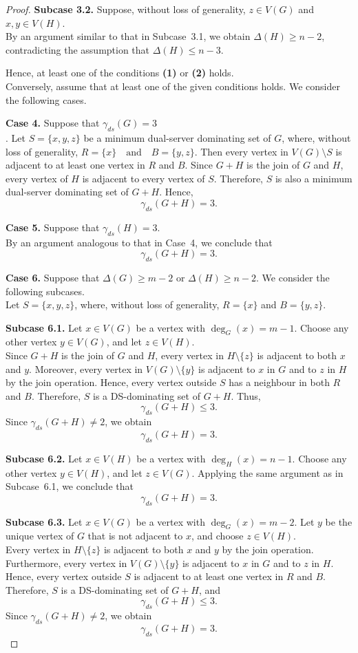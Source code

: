 \documentclass{article}
\begin{document}
\begin{proof}
\textbf{Subcase 3.2.} Suppose, without loss of generality, $z\in V(G)$ and $x,y\in V(H).$\\  By an argument similar to that in Subcase~3.1, we obtain $
\Delta(H)\ge n-2$,
contradicting the assumption that $
\Delta(H)\le n-3$.

Hence, at least one of the conditions \textbf{(1)} or \textbf{(2)} holds. \\
Conversely, assume that at least one of the given conditions holds. We consider the following cases.

\textbf{Case 4.} Suppose that $\gamma_{ds}(G)=3$\\. Let $S=\{x,y,z\}$
be a minimum dual-server dominating set of $G$, where, without loss of generality, $R=\{x\} \quad \text{and} \quad B=\{y,z\}$. Then every vertex in $V(G)\setminus S$ is adjacent to at least one vertex in $R$ and $B$. Since $G+H$ is the join of $G$ and $H$, every vertex of $H$ is adjacent to every vertex of $S$. Therefore, $S$ is also a minimum dual-server dominating set of $G+H$. Hence,
\[
\gamma_{ds}(G+H)= 3.
\]

\textbf{Case 5.} Suppose that $\gamma_{ds}(H)=3$.\\ By an argument analogous to that in Case~4, we conclude that
\[
\gamma_{ds}(G+H)=3.
\]

\textbf{Case 6.} Suppose that $\Delta(G)\ge m-2$  or  $\Delta(H)\ge n-2$.
We consider the following subcases.\\
Let $S=\{x,y,z\}$,
where, without loss of generality, $R=\{x\}$ and  $B=\{y,z\}$.

\textbf{Subcase 6.1.} Let $x\in V(G)$ be a vertex with $\deg_G(x)=m-1$.
Choose any other vertex $y\in V(G)$, and let $z\in V(H)$.\\
Since $G+H$ is the join of $G$ and $H$, every vertex in $H\setminus\{z\}$ is adjacent to both $x$ and $y$. Moreover, every vertex in $V(G)\setminus\{y\}$ is adjacent to $x$ in $G$ and to $z$ in $H$ by the join operation. Hence, every vertex outside $S$ has a neighbour in both $R$ and $B$. Therefore, $S$ is a DS-dominating set of $G+H$. Thus,
\[
\gamma_{ds}(G+H)\le 3.
\]
Since $\gamma_{ds}(G+H)\neq 2$, we obtain
\[
\gamma_{ds}(G+H)=3.
\]

\textbf{Subcase 6.2.} Let $x\in V(H)$ be a vertex with $\deg_H(x)=n-1$.
Choose any other vertex $y\in V(H)$, and let $z\in V(G)$.
Applying the same argument as in Subcase~6.1, we conclude that
\[
\gamma_{ds}(G+H)=3.
\]

\textbf{Subcase 6.3.} Let $x\in V(G)$ be a vertex with $\deg_G(x)=m-2.$
Let $y$ be the unique vertex of $G$ that is not adjacent to $x$, and choose $z\in V(H)$.\\
Every vertex in $H\setminus\{z\}$ is adjacent to both $x$ and $y$ by the join operation. Furthermore, every vertex in $V(G)\setminus\{y\}$ is adjacent to $x$ in $G$ and to $z$ in $H$. Hence, every vertex outside $S$ is adjacent to at least one vertex in $R$ and  $B$. Therefore, $S$ is a DS-dominating set of $G+H$, and
\[
\gamma_{ds}(G+H)\le 3.
\]
Since $\gamma_{ds}(G+H)\neq 2$, we obtain
\[
\gamma_{ds}(G+H)=3.
\]


\end{proof}
\end{document}
